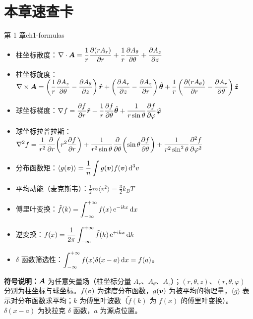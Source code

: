 \section*{本章速查卡}
{}
\begin{formulabox}{第 1 章}{ch1-formulas}
\begin{itemize}[leftmargin=*,itemsep=0pt]
\item 柱坐标散度：$\displaystyle\nabla\cdot\bm{A} = \frac{1}{r}\frac{\partial(rA_r)}{\partial r} + \frac{1}{r}\frac{\partial A_\theta}{\partial\theta} + \frac{\partial A_z}{\partial z}$
\item 柱坐标旋度：$\displaystyle\nabla\times\bm{A} = \left(\frac{1}{r}\frac{\partial A_z}{\partial\theta} - \frac{\partial A_\theta}{\partial z}\right)\hat{\bm{r}} + \left(\frac{\partial A_r}{\partial z} - \frac{\partial A_z}{\partial r}\right)\hat{\bm{\theta}} + \frac{1}{r}\left(\frac{\partial(rA_\theta)}{\partial r} - \frac{\partial A_r}{\partial\theta}\right)\hat{\bm{z}}$
\item 球坐标梯度：$\displaystyle\nabla f = \frac{\partial f}{\partial r}\hat{\bm{r}} + \frac{1}{r}\frac{\partial f}{\partial\theta}\hat{\bm{\theta}} + \frac{1}{r\sin\theta}\frac{\partial f}{\partial\varphi}\hat{\bm{\varphi}}$
\item 球坐标拉普拉斯：$\displaystyle\nabla^2 f = \frac{1}{r^2}\frac{\partial}{\partial r}\!\left(r^2\frac{\partial f}{\partial r}\right) + \frac{1}{r^2\sin\theta}\frac{\partial}{\partial\theta}\!\left(\sin\theta\frac{\partial f}{\partial\theta}\right) + \frac{1}{r^2\sin^2\theta}\frac{\partial^2 f}{\partial\varphi^2}$
\item 分布函数矩：$\displaystyle\langle g(\bm{v})\rangle = \frac{1}{n}\int g(\bm{v})f(\bm{v})\,\mathrm{d}^3v$
\item 平均动能（麦克斯韦）：$\displaystyle\frac{1}{2}m\langle v^2\rangle = \frac{3}{2}k_{\!B}T$
\item 傅里叶变换：$\displaystyle\tilde{f}(k) = \int_{-\infty}^{+\infty} f(x)\,\mathrm{e}^{-\mathrm{i} kx}\,\mathrm{d} x$
\item 逆变换：$\displaystyle f(x) = \frac{1}{2\pi}\int_{-\infty}^{+\infty} \tilde{f}(k)\,\mathrm{e}^{+\mathrm{i} kx}\,\mathrm{d} k$
\item $\delta$ 函数筛选性：$\displaystyle\int_{-\infty}^{+\infty} f(x)\delta(x-a)\,\mathrm{d} x = f(a)$。
\end{itemize}
\textbf{符号说明：}$\bm{A}$ 为任意矢量场（柱坐标分量 $A_r$、$A_\theta$、$A_z$）；$(r,\theta,z)$、$(r,\theta,\varphi)$ 分别为柱坐标与球坐标。$f(\bm{v})$ 为速度分布函数，$g(\bm{v})$ 为被平均的物理量，$\langle g\rangle$ 表示对分布函数求平均；$k$ 为傅里叶波数（$\tilde f(k)$ 为 $f(x)$ 的傅里叶变换）。$\delta(x-a)$ 为狄拉克 $\delta$ 函数，$a$ 为源点位置。
\end{formulabox}

